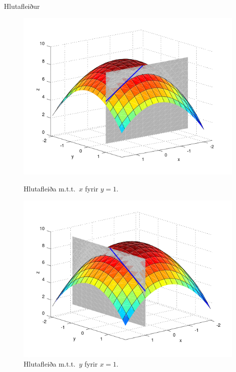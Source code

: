 \begin {frame}{Hlutafleiður}
 \begin{figure}[!h]
        \centering
        \begin{minipage}{.5\textwidth}
            \centering
            \includegraphics[width=1\linewidth]{xpart.png}
            \caption*{Hlutafleiða m.t.t.~$x$ fyrir $y=1$.}
        \end{minipage}%
        \begin{minipage}{.5\textwidth}
            \centering
            \includegraphics[width=1\linewidth]{ypart.png}
            \caption*{Hlutafleiða m.t.t.~$y$ fyrir $x=1$.}
        \end{minipage}
    \end{figure}
 
\end {frame}


